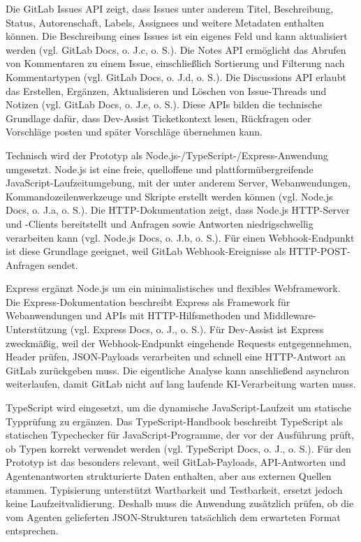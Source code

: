 \documentclass[12pt,a4paper,oneside]{scrreprt}
\begin{document}
Die GitLab Issues API zeigt, dass Issues unter anderem Titel, Beschreibung, Status, Autorenschaft, Labels, Assignees und weitere Metadaten enthalten können. Die Beschreibung eines Issues ist ein eigenes Feld und kann aktualisiert werden (vgl. GitLab Docs, o. J.c, o. S.). Die Notes API ermöglicht das Abrufen von Kommentaren zu einem Issue, einschließlich Sortierung und Filterung nach Kommentartypen (vgl. GitLab Docs, o. J.d, o. S.). Die Discussions API erlaubt das Erstellen, Ergänzen, Aktualisieren und Löschen von Issue-Threads und Notizen (vgl. GitLab Docs, o. J.e, o. S.). Diese APIs bilden die technische Grundlage dafür, dass Dev-Assist Ticketkontext lesen, Rückfragen oder Vorschläge posten und später Vorschläge übernehmen kann.

Technisch wird der Prototyp als Node.js-/TypeScript-/Express-Anwendung umgesetzt. Node.js ist eine freie, quelloffene und plattformübergreifende JavaScript-Laufzeitumgebung, mit der unter anderem Server, Webanwendungen, Kommandozeilenwerkzeuge und Skripte erstellt werden können (vgl. Node.js Docs, o. J.a, o. S.). Die HTTP-Dokumentation zeigt, dass Node.js HTTP-Server und -Clients bereitstellt und Anfragen sowie Antworten niedrigschwellig verarbeiten kann (vgl. Node.js Docs, o. J.b, o. S.). Für einen Webhook-Endpunkt ist diese Grundlage geeignet, weil GitLab Webhook-Ereignisse als HTTP-POST-Anfragen sendet.

Express ergänzt Node.js um ein minimalistisches und flexibles Webframework. Die Express-Dokumentation beschreibt Express als Framework für Webanwendungen und APIs mit HTTP-Hilfsmethoden und Middleware-Unterstützung (vgl. Express Docs, o. J., o. S.). Für Dev-Assist ist Express zweckmäßig, weil der Webhook-Endpunkt eingehende Requests entgegennehmen, Header prüfen, JSON-Payloads verarbeiten und schnell eine HTTP-Antwort an GitLab zurückgeben muss. Die eigentliche Analyse kann anschließend asynchron weiterlaufen, damit GitLab nicht auf lang laufende KI-Verarbeitung warten muss.

TypeScript wird eingesetzt, um die dynamische JavaScript-Laufzeit um statische Typprüfung zu ergänzen. Das TypeScript-Handbook beschreibt TypeScript als statischen Typechecker für JavaScript-Programme, der vor der Ausführung prüft, ob Typen korrekt verwendet werden (vgl. TypeScript Docs, o. J., o. S.). Für den Prototyp ist das besonders relevant, weil GitLab-Payloads, API-Antworten und Agentenantworten strukturierte Daten enthalten, aber aus externen Quellen stammen. Typisierung unterstützt Wartbarkeit und Testbarkeit, ersetzt jedoch keine Laufzeitvalidierung. Deshalb muss die Anwendung zusätzlich prüfen, ob die vom Agenten gelieferten JSON-Strukturen tatsächlich dem erwarteten Format entsprechen.
\end{document}
